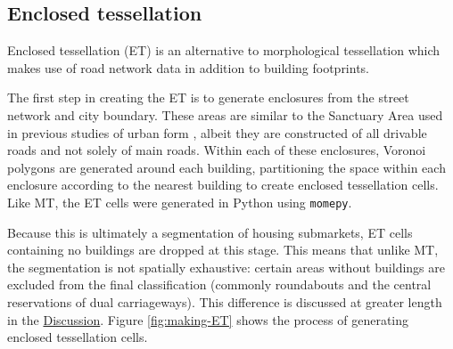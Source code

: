 \documentclass[a4paper, nobind]{templates/ociamthesis}
\begin{document}
\hypertarget{enclosed-tessellation}{%
\subsection{Enclosed tessellation}\label{enclosed-tessellation}}

Enclosed tessellation (ET) is an alternative to morphological tessellation which makes use of road network data in addition to building footprints.

The first step in creating the ET is to generate enclosures from the street network and city boundary. These areas are similar to the Sanctuary Area used in previous studies of urban form \citep{mehaffy2010, dibble2019}, albeit they are constructed of all drivable roads and not solely of main roads. Within each of these enclosures, Voronoi polygons are generated around each building, partitioning the space within each enclosure according to the nearest building to create enclosed tessellation cells. Like MT, the ET cells were generated in Python using \texttt{momepy}.

Because this is ultimately a segmentation of housing submarkets, ET cells containing no buildings are dropped at this stage. This means that unlike MT, the segmentation is not spatially exhaustive: certain areas without buildings are excluded from the final classification (commonly roundabouts and the central reservations of dual carriageways). This difference is discussed at greater length in the \protect\hyperlink{morphological-and-enclosed-tessellation}{Discussion}. Figure \ref{fig:making-ET} shows the process of generating enclosed tessellation cells.
\end{document}
